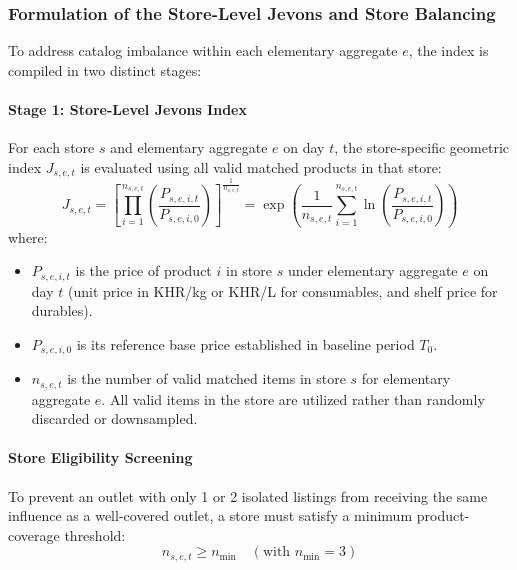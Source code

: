\subsubsection{Formulation of the Store-Level Jevons and Store Balancing}
\hs To address catalog imbalance within each elementary aggregate $e$, the index is compiled in two distinct stages:

\paragraph{Stage 1: Store-Level Jevons Index}
For each store $s$ and elementary aggregate $e$ on day $t$, the store-specific geometric index $J_{s, e, t}$ is evaluated using all valid matched products in that store:
\begin{equation}
    J_{s, e, t} = \left[ \prod_{i=1}^{n_{s, e, t}} \left( \frac{P_{s, e, i, t}}{P_{s, e, i, 0}} \right) \right]^{\frac{1}{n_{s, e, t}}} = \exp\left( \frac{1}{n_{s, e, t}} \sum_{i=1}^{n_{s, e, t}} \ln \left( \frac{P_{s, e, i, t}}{P_{s, e, i, 0}} \right) \right)
\end{equation}
where:
\begin{itemize}
    \item $P_{s, e, i, t}$ is the price of product $i$ in store $s$ under elementary aggregate $e$ on day $t$ (unit price in KHR/kg or KHR/L for consumables, and shelf price for durables).
    \item $P_{s, e, i, 0}$ is its reference base price established in baseline period $T_0$.
    \item $n_{s, e, t}$ is the number of valid matched items in store $s$ for elementary aggregate $e$. All valid items in the store are utilized rather than randomly discarded or downsampled.
\end{itemize}

\paragraph{Store Eligibility Screening}
To prevent an outlet with only 1 or 2 isolated listings from receiving the same influence as a well-covered outlet, a store must satisfy a minimum product-coverage threshold:
\begin{equation}
    n_{s, e, t} \ge n_{\text{min}} \quad (\text{with } n_{\text{min}} = 3)
\end{equation}

